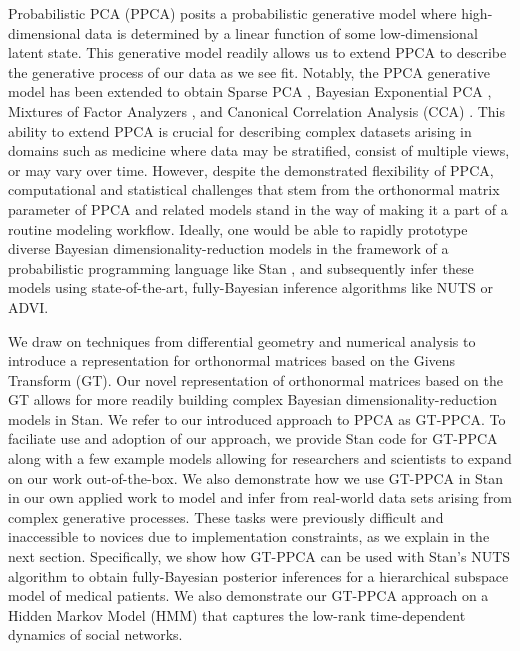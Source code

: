 \documentclass{article}
\begin{document}
Probabilistic PCA (PPCA) \citep{tipping1999probabilistic} posits a probabilistic generative model where high-dimensional data is determined by a linear function of some low-dimensional latent state. This generative model readily allows us to extend PPCA to describe the generative process of our data as we see fit. Notably, the PPCA generative model has been extended to obtain Sparse PCA \citep{hoff2009simulation}, Bayesian Exponential PCA \citep{mohamed2009bayesian}, Mixtures of Factor Analyzers \citep{ghahramani1996algorithm}, and Canonical Correlation Analysis (CCA) \citep[chapt.~12.5]{murphy2012machine}. This ability to extend PPCA is crucial for describing complex datasets arising in domains such as medicine where data may be stratified, consist of multiple views, or may vary over time. However, despite the demonstrated flexibility of PPCA, computational and statistical challenges that stem from the orthonormal matrix parameter of PPCA and related models stand in the way of making it a part of a routine modeling workflow. Ideally, one would be able to rapidly prototype diverse Bayesian dimensionality-reduction models in the framework of a probabilistic programming language like Stan \citep{carpenter2016stan}, and subsequently infer these models using state-of-the-art, fully-Bayesian inference algorithms like NUTS or ADVI. 

We draw on techniques from differential geometry and numerical analysis to introduce a representation for orthonormal matrices based on the Givens Transform (GT).  Our novel representation of orthonormal matrices based on the GT allows for more readily building complex Bayesian dimensionality-reduction models in Stan.  We refer to our introduced approach to PPCA as GT-PPCA.  To faciliate use and adoption  of our approach, we provide Stan code for GT-PPCA along with a few example models allowing for researchers and scientists to expand on our work out-of-the-box.  We also demonstrate how we use GT-PPCA in Stan in our own applied work to model and infer from real-world data sets arising from complex generative processes.  These tasks were previously difficult and inaccessible to novices due to implementation constraints, as we explain in the next section.  Specifically, we show how GT-PPCA can be used with Stan's NUTS algorithm to obtain fully-Bayesian posterior inferences for a hierarchical subspace model of medical patients.  We also demonstrate our GT-PPCA approach on a Hidden Markov Model (HMM) that captures the low-rank time-dependent dynamics of social networks.
\end{document}
